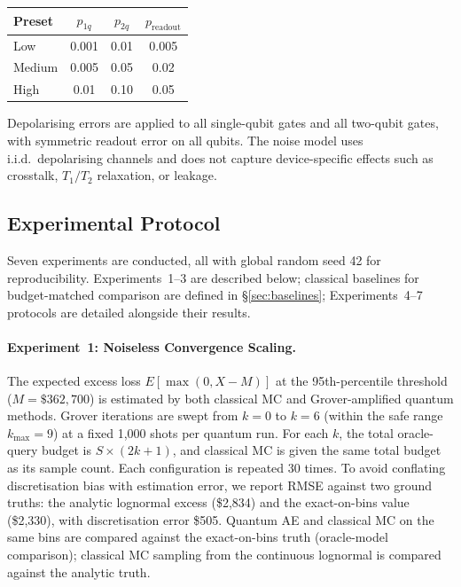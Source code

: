 \documentclass[11pt,a4paper]{article}
\begin{document}
\begin{center}
\begin{tabular}{lccc}
\toprule
Preset & $p_{1q}$ & $p_{2q}$ & $p_{\text{readout}}$ \\
\midrule
Low & 0.001 & 0.01 & 0.005 \\
Medium & 0.005 & 0.05 & 0.02 \\
High & 0.01 & 0.10 & 0.05 \\
\bottomrule
\end{tabular}
\end{center}

Depolarising errors are applied to all single-qubit gates and all two-qubit gates, with symmetric readout error on all qubits. The noise model uses i.i.d.\ depolarising channels and does not capture device-specific effects such as crosstalk, $T_1/T_2$ relaxation, or leakage.

\subsection{Experimental Protocol}

Seven experiments are conducted, all with global random seed 42 for reproducibility. Experiments~1--3 are described below; classical baselines for budget-matched comparison are defined in \S\ref{sec:baselines}; Experiments~4--7 protocols are detailed alongside their results.

\paragraph{Experiment~1: Noiseless Convergence Scaling.} The expected excess loss $E[\max(0, X-M)]$ at the 95th-percentile threshold ($M = \$362{,}700$) is estimated by both classical MC and Grover-amplified quantum methods. Grover iterations are swept from $k=0$ to $k=6$ (within the safe range $k_{\max} = 9$) at a fixed 1,000 shots per quantum run. For each $k$, the total oracle-query budget is $S \times (2k+1)$, and classical MC is given the same total budget as its sample count. Each configuration is repeated 30 times. To avoid conflating discretisation bias with estimation error, we report RMSE against two ground truths: the analytic lognormal excess (\$2,834) and the exact-on-bins value (\$2,330), with discretisation error \$505. Quantum AE and classical MC on the same bins are compared against the exact-on-bins truth (oracle-model comparison); classical MC sampling from the continuous lognormal is compared against the analytic truth.
\end{document}
